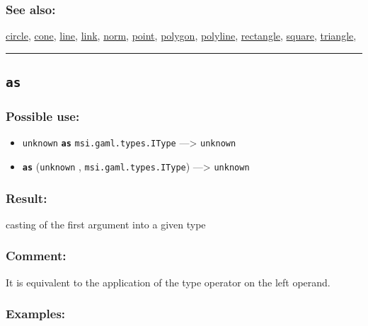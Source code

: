 \documentclass[]{book}
\providecommand{\tightlist}{%
  \setlength{\itemsep}{0pt}\setlength{\parskip}{0pt}}
\theoremstyle{definition}
\theoremstyle{definition}
\theoremstyle{definition}
\theoremstyle{remark}
\begin{document}
\subsubsection{See also:}\label{see-also-28}

\href{OperatorsBC\#circle}{circle}, \href{OperatorsBC\#cone}{cone},
\href{OperatorsIM\#line}{line}, \href{OperatorsIM\#link}{link},
\href{OperatorsNR\#norm}{norm}, \href{OperatorsNR\#point}{point},
\href{OperatorsNR\#polygon}{polygon},
\href{OperatorsNR\#polyline}{polyline},
\href{OperatorsNR\#rectangle}{rectangle},
\href{OperatorsSZ\#square}{square},
\href{OperatorsSZ\#triangle}{triangle},

\begin{center}\rule{0.5\linewidth}{\linethickness}\end{center}

\subsection{\texorpdfstring{\texttt{as}}{as}}\label{as}

\subsubsection{Possible use:}\label{possible-use-43}

\begin{itemize}
\tightlist
\item
  \texttt{unknown} \textbf{\texttt{as}} \texttt{msi.gaml.types.IType}
  ---\textgreater{} \texttt{unknown}
\item
  \textbf{\texttt{as}} (\texttt{unknown} ,
  \texttt{msi.gaml.types.IType}) ---\textgreater{} \texttt{unknown}
\end{itemize}

\subsubsection{Result:}\label{result-42}

casting of the first argument into a given type

\subsubsection{Comment:}\label{comment-8}

It is equivalent to the application of the type operator on the left
operand.

\subsubsection{Examples:}\label{examples-35}
\end{document}
